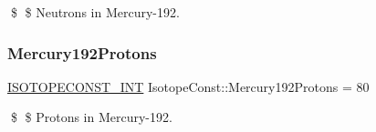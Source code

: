 \$ \$ Neutrons in Mercury-\/192. \mbox{\label{group___isotope_const-_mercury-_hg192_ga86690e00cabbf9e52963943be7979e70}} 
\subsubsection{\texorpdfstring{Mercury192\+Protons}{Mercury192Protons}}
{\footnotesize\ttfamily \mbox{\hyperlink{group___isotope_const-_macros_ga5f18360b3e99483a35c32d789e62621c}{I\+S\+O\+T\+O\+P\+E\+C\+O\+N\+S\+T\+\_\+\+I\+NT}} Isotope\+Const\+::\+Mercury192\+Protons = 80}

\$ \$ Protons in Mercury-\/192. 